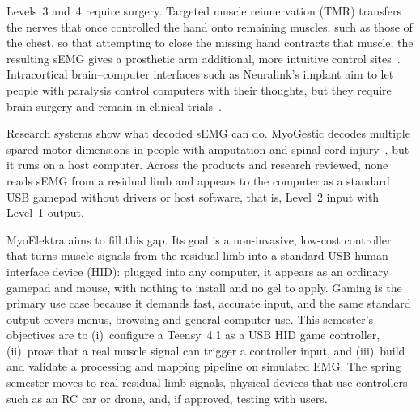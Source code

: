 \documentclass[conference]{IEEEtran}
\begin{document}
Levels~3 and~4 require surgery. Targeted muscle reinnervation (TMR) transfers the nerves that once controlled the hand onto remaining muscles, such as those of the chest, so that attempting to close the missing hand contracts that muscle; the resulting sEMG gives a prosthetic arm additional, more intuitive control sites~\cite{kuiken}. Intracortical brain--computer interfaces such as Neuralink's implant aim to let people with paralysis control computers with their thoughts, but they require brain surgery and remain in clinical trials~\cite{prime}.

Research systems show what decoded sEMG can do. MyoGestic decodes multiple spared motor dimensions in people with amputation and spinal cord injury~\cite{myogestic}, but it runs on a host computer. Across the products and research reviewed, none reads sEMG from a residual limb and appears to the computer as a standard USB gamepad without drivers or host software, that is, Level~2 input with Level~1 output.

MyoElektra aims to fill this gap. Its goal is a non-invasive, low-cost controller that turns muscle signals from the residual limb into a standard USB human interface device (HID): plugged into any computer, it appears as an ordinary gamepad and mouse, with nothing to install and no gel to apply. Gaming is the primary use case because it demands fast, accurate input, and the same standard output covers menus, browsing and general computer use. This semester's objectives are to (i)~configure a Teensy~4.1 as a USB HID game controller, (ii)~prove that a real muscle signal can trigger a controller input, and (iii)~build and validate a processing and mapping pipeline on simulated EMG. The spring semester moves to real residual-limb signals, physical devices that use controllers such as an RC car or drone, and, if approved, testing with users.
\end{document}
